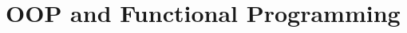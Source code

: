\documentclass{article}
\begin{document}
    \setcounter{section}{11}
    \section{OOP and Functional Programming}
    \setcounter{subsection}{66}
    
    
    
    
    
    
\end{document}
